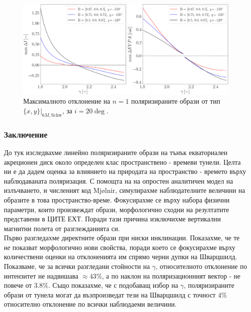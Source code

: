 \begin{figure}[!htb]
	\centering
	\includegraphics[scale = 0.25]{WH_20_deg_param_sweep_n1.png}
	\caption[Максималното отклонение на $n=1$ поляризираните образи от тип $\{x,y\}\vert_{6M, \text{Schw}}$, за $i = 20\deg$]{Максималното отклонение на $n=1$ поляризираните образи от тип $\{x,y\}\vert_{6M, \text{Schw}}$, за $i = 20\deg$.} 
	\label{WH_max_deviation_20_deg_n1}
\end{figure}
\newpage

\subsubsection{Заключение}

До тук изследвахме линейно поляризираните образи на тънък екваториален акреционен диск около определен клас пространствено - времеви тунели. Целта ни е да дадем оценка за влиянието на природата на пространство - времето върху наблюдаваната поляризация. С помощта на на опростен аналитичен модел на излъчването, и численият код Mjølnir, симулирахме наблюдателните величини на образите в това пространство-време. Фокусирахме се върху набора физични параметри, които произвеждат образи, морфологично сходни на резултатите представени в ЦИТЕ ЕХТ. Поради тази причина изключихме вертикални магнитни полета от разглежданията си.\\

Първо разгледахме директните образи при ниски инклинации. Показахме, че те \emph{не} показват морфологично нови свойства, поради което се фокусирахме върху количествени оценки на отклоненията им спрямо черни дупки на Шварцшилд. Показваме, че за всички разгледани стойности на $\gamma$, относителното отклонение по интензитет не надвишава $\approx 43\%$, а по наклон на поляризационният вектор - не повече от $3.8\%$. Също показахме, че с подобаващ избор на $\gamma$, поляризираните образи от тунела могат да възпроизведат тези на Шварцшилд с точност $4\%$ относително отклонение по всички наблюдаеми величини. \\

